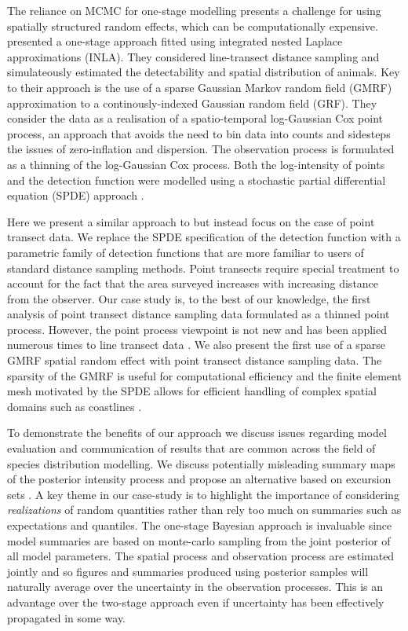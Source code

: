 \documentclass[preprint,12pt]{elsarticle}
\begin{document}
The reliance on MCMC for one-stage modelling presents a challenge for using spatially structured random effects, which can be computationally expensive.  \citet{yuan_point_2017} presented a one-stage approach fitted using integrated nested Laplace approximations (INLA).  They considered line-transect distance sampling and simulateously estimated the detectability and spatial distribution of animals.
Key to their approach is the use of a sparse Gaussian Markov random field (GMRF) approximation to a continously-indexed Gaussian random field (GRF).  They consider the data as a realisation of a spatio-temporal log-Gaussian Cox point process, an approach that avoids the need to bin data into counts and sidesteps the issues of zero-inflation and dispersion.  The observation process is formulated as a thinning of the log-Gaussian Cox process.  Both the log-intensity of points and the detection function were modelled using a stochastic partial differential equation (SPDE) approach \citep{lindgren_explicit_2011}.

Here we present a similar approach to \citet{yuan_point_2017} but instead focus on the case of point transect data.  We replace the SPDE specification of the detection function with a parametric family of detection functions that are more familiar to users of standard distance sampling methods.  Point transects require special treatment to account for the fact that the area surveyed increases with increasing distance from the observer.  Our case study is, to the best of our knowledge, the first analysis of point transect distance sampling data formulated as a thinned point process.  However, the point process viewpoint is not new and has been applied numerous times to line transect data \citep{buckland_model-based_2016, johnson_model-based_2010, hedley_spatial_2004, stoyan_remark_1982, hogmander_random_1991}.  We also present the first use of a sparse GMRF spatial random effect with point transect distance sampling data.  The sparsity of the GMRF is useful for computational efficiency and the finite element mesh motivated by the SPDE allows for efficient handling of complex spatial domains such as coastlines \citep{simpson_going_2016}.   

To demonstrate the benefits of our approach we discuss issues regarding model evaluation and communication of results that are common across the field of species distribution modelling. We discuss potentially misleading summary maps of the posterior intensity process and propose an alternative based on excursion sets \citep{bolin_excursion_2015, bolin_calculating_2018}.  A key theme in our case-study is to highlight the importance of considering \textit{realizations} of random quantities rather than rely too much on summaries such as expectations and quantiles.  The one-stage Bayesian approach is invaluable since model summaries are based on monte-carlo sampling from the joint posterior of all model parameters. The spatial process and observation process are estimated jointly and so figures and summaries produced using posterior samples will naturally average over the uncertainty in the observation processes.  This is an advantage over the two-stage approach even if uncertainty has been effectively propagated in some way.  
\end{document}
